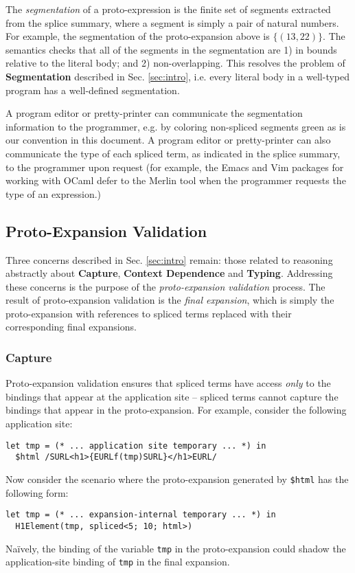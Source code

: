 \documentclass[acmsmall,10pt,review,anonymous]{acmart}\settopmatter{printfolios=true}
\newcommand{\li}[1]{\lstinline{#1}}
\begin{document}
The \emph{segmentation} of a proto-expression is the finite set of segments extracted from the splice summary, where a segment is simply a pair of natural numbers. For example, the segmentation of the proto-expansion above is $\{(13, 22)\}$. 
The semantics checks that all of the segments in the segmentation are 1) in bounds relative to the literal body; and 2) non-overlapping. 
This resolves the problem of \textbf{Segmentation} described in Sec. \ref{sec:intro}, i.e. every literal body in a well-typed program has a well-defined segmentation. 

A program editor or pretty-printer can communicate the segmentation information to the programmer, e.g. by coloring non-spliced segments green as is our convention in this document. 
A program editor or pretty-printer can also communicate the type of each spliced term, as indicated in the splice summary, to the programmer upon request (for example, the Emacs and Vim packages for working with OCaml defer to the Merlin tool when the programmer requests the type of an expression.)


\subsection{Proto-Expansion Validation}\label{sec:uetsms-validation}
Three concerns described in Sec. \ref{sec:intro} remain: those related to reasoning abstractly about \textbf{Capture}, \textbf{Context Dependence} and \textbf{Typing}. Addressing these concerns is the purpose of the \emph{proto-expansion validation} process. 
The result of proto-expansion validation is the \emph{final expansion}, which is simply the proto-expansion with  references to spliced terms replaced with their corresponding final expansions. 


\subsubsection{Capture}
Proto-expansion validation ensures that spliced terms have access \emph{only} to the bindings that appear at the application site -- spliced terms cannot capture the bindings that appear in the proto-expansion. For example, consider the following application site:
\begin{lstlisting}[numbers=none]
  let tmp = (* ... application site temporary ... *) in 
  $html /SURL<h1>{EURLf(tmp)SURL}</h1>EURL/
\end{lstlisting}
Now consider the scenario where the proto-expansion generated by \li{$html} has the following form:
\begin{lstlisting}[numbers=none]
  let tmp = (* ... expansion-internal temporary ... *) in 
  H1Element(tmp, spliced<5; 10; html>)
\end{lstlisting}
Na\"ively, the binding of the variable \li{tmp} in the proto-expansion could shadow the application-site binding of \li{tmp} in the final expansion.
\end{document}
